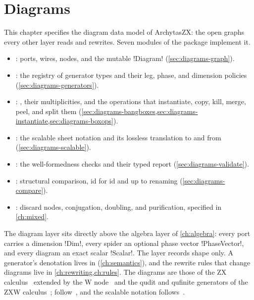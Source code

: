 \chapter{Diagrams}\label{ch:diagrams}

This chapter specifies the diagram data model of ArchytasZX: the open graphs every other layer reads and rewrites. Seven modules of the package  implement it.
\begin{itemize}
\item {}: ports, wires, nodes, and the mutable \py!Diagram! (\cref{sec:diagrams-graph}).
\item {}: the registry of generator types and their leg, phase, and dimension policies (\cref{sec:diagrams-generators}).
\item {}: \bboxes{}, their multiplicities, and the operations that instantiate, copy, kill, merge, peel, and split them (\cref{sec:diagrams-bangboxes,sec:diagrams-instantiate,sec:diagrams-boxops}).
\item {}: the scalable sheet notation and its lossless translation to and from \bboxes{} (\cref{sec:diagrams-scalable}).
\item {}: the well-formedness checks and their typed report (\cref{sec:diagrams-validate}).
\item {}: structural comparison, id for id and up to renaming (\cref{sec:diagrams-compare}).
\item {}: discard nodes, conjugation, doubling, and purification, specified in \cref{ch:mixed}.
\end{itemize}
The diagram layer sits directly above the algebra layer of \cref{ch:algebra}: every port carries a dimension \py!Dim!, every spider an optional phase vector \py!PhaseVector!, and every diagram an exact scalar \py!Scalar!. The layer records shape only. A generator's denotation lives in  (\cref{ch:semantics}), and the rewrite rules that change diagrams live in \cref{ch:rewriting,ch:rules}. The diagrams are those of the ZX calculus~\cite{coecke2011interacting,vandewetering2020working} extended by the W node~\cite{hadzihasanovic2015zw} and the qudit and qufinite generators of the ZXW calculus~\cite{wang2021qufinite,poor2023zxw,wang2023qufinitezxw}; \bboxes{} follow~\cite{dixon2009graphical,kissinger2014pattern,kissinger2015firstorder}, and the scalable notation follows~\cite{carette2019szx,carette2022bangboxes}.

